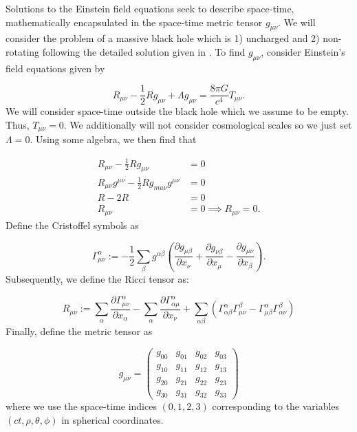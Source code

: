 \documentclass{CUP-JNL-DTM}%
\theoremstyle{definition}
\numberwithin{equation}{section}
\begin{document}
Solutions to the Einstein field equations seek to describe space-time, mathematically encapsulated in the space-time metric tensor $g_{\mu\nu}$. We will consider the problem of a massive black hole which is 1) uncharged and 2) non-rotating following the detailed solution given in \cite{eigenchrisRelativity108aSchwarzschild}. To find $g_{\mu\nu}$, consider Einstein's field equations given by 

\begin{equation}
    R_{\mu\nu} - \frac{1}{2}R g_{\mu\nu} + \Lambda g_{\mu\nu} = \frac{8 \pi G}{c^4}T_{\mu\nu}.
    \label{eqn:EFE}
\end{equation}
We will consider space-time outside the black hole which we assume to be empty. Thus, $T_{\mu\nu} = 0$. We additionally will not consider cosmological scales so we just set $\Lambda = 0$. Using some algebra, we then find that

\begin{equation}
\begin{split}
    R_{\mu\nu} - \frac{1}{2}Rg_{\mu\nu} & = 0 \\
    R_{\mu\nu}g^{\mu\nu} - \frac{1}{2}Rg_{mu\nu}g^{\mu\nu} & = 0 \\
    R - 2R & = 0 \\ 
    R_{\mu\nu} & = 0 \implies \boxed{R_{\mu\nu} = 0}. 
\end{split}
\end{equation}
Define the Cristoffel symbols as

\begin{equation}
    \Gamma^{\alpha}_{\mu\nu} := -\frac{1}{2}\sum_{\beta}g^{\alpha\beta}\left(\frac{\partial g_{\mu\beta}}{\partial x_{\nu}} + \frac{\partial g_{\nu\beta}}{\partial x_{\mu}} - \frac{\partial g_{\mu\nu}}{\partial x_{\beta}}\right).
    \label{eqn:ccs}
\end{equation}
Subsequently, we define the Ricci tensor as:

\begin{equation}
    R_{\mu\nu} := \sum_{\alpha} \frac{\partial \Gamma^{\alpha}_{\mu\nu}}{\partial x_{\alpha}} - \sum_{\alpha} \frac{\partial \Gamma^{\alpha}_{\alpha\mu}}{\partial x_{\nu}} + \sum_{\alpha\beta} \left(\Gamma^{\alpha}_{\alpha\beta} \Gamma^{\beta}_{\mu\nu} - \Gamma^{\alpha}_{\mu\beta} \Gamma^{\beta}_{\alpha\nu}\right)
    \label{eqn:ricci}
\end{equation}
Finally, define the metric tensor as 

\begin{equation}
    g_{\mu\nu} = \begin{pmatrix}
        g_{00} & g_{01} & g_{02} & g_{03} \\
        g_{10} & g_{11} & g_{12} & g_{13} \\
        g_{20} & g_{21} & g_{22} & g_{23} \\
        g_{30} & g_{31} & g_{32} & g_{33}
    \end{pmatrix}
\end{equation}
where we use the space-time indices $(0,1,2,3)$ corresponding to the variables $(ct, \rho, \theta, \phi)$ in spherical coordinates. 
\end{document}
